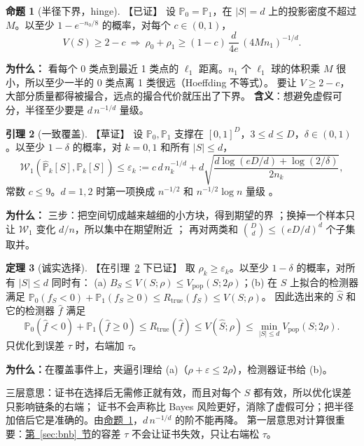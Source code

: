 \documentclass[11pt,a4paper,fontset=none]{ctexart}
\newcommand{\Secref}[1]{\hyperref[#1]{第~\ref*{#1}~节}}
\newcommand{\Nref}[2]{\hyperref[#2]{#1~\ref*{#2}}}
\newcommand{\Vp}{V_{\mathrm{pop}}}
\newcommand{\Rt}{R_{\mathrm{true}}}
\theoremstyle{definition}
\newtheorem{proposition}{命题}
\newtheorem{lemma}[proposition]{引理}
\newtheorem{theorem}[proposition]{定理}
\newenvironment{why}{\par\noindent\textbf{为什么：}\ignorespaces}{\par}
\newcommand{\status}[1]{\textrm{【#1】}}
\begin{document}
\begin{proposition}[半径下界，hinge]\label{prop:collapse}\status{已证}
设 $\mathbb P_0=\mathbb P_1$，在 $|S|=d$ 上的投影密度不超过 $M$。以至少 $1-e^{-n_0/8}$ 的概率，对每个 $c\in(0,1)$，
\[
V(S)\ge2-c\ \Longrightarrow\ \rho_0+\rho_1\ge(1-c)\,\frac d{4e}\,(4Mn_1)^{-1/d}.
\]
\end{proposition}
\begin{why}
看每个 0 类点到最近 1 类点的 $\ell_1$ 距离。$n_1$ 个 $\ell_1$ 球的体积乘 $M$ 很小，所以至少一半的 0 类点离 1 类很远（Hoeffding 不等式）。
要让 $V\ge2-c$，大部分质量都得被撮合，远点的撮合代价就压出了下界。
\textbf{含义}：想避免虚假可分，半径至少要是 $d\,n^{-1/d}$ 量级。
\end{why}

\begin{lemma}[一致覆盖]\label{lem:coverage}\status{草证}
设 $\mathbb P_0,\mathbb P_1$ 支撑在 $[0,1]^D$，$3\le d\le D$，$\delta\in(0,1)$。以至少 $1-\delta$ 的概率，对 $k=0,1$ 和所有 $|S|\le d$，
\[
\mathcal W_1(\widehat{\mathbb P}_k[S],\mathbb P_k[S])\le\varepsilon_k:=c\,d\,n_k^{-1/d}+d\sqrt{\frac{d\log(eD/d)+\log(2/\delta)}{2n_k}},
\]
常数 $c\le9$。$d=1,2$ 时第一项换成 $n^{-1/2}$ 和 $n^{-1/2}\log n$ 量级 \cite{fournier2015rate}。
\end{lemma}
\begin{why}
三步：把空间切成越来越细的小方块，得到期望的界 \cite{weed2019sharp}；换掉一个样本只让 $\mathcal W_1$ 变化 $d/n$，所以集中在期望附近 \cite{mcdiarmid1989method}；
再对两类和 $\binom Dd\le(eD/d)^d$ 个子集取并。
\end{why}

\begin{theorem}[诚实选择]\label{thm:honest}\status{在引理~\ref{lem:coverage} 下已证}
取 $\rho_k\ge\varepsilon_k$。以至少 $1-\delta$ 的概率，对所有 $|S|\le d$ 同时有：
(a) $B_S\le V(S;\rho)\le\Vp(S;2\rho)$；(b) 在 $S$ 上拟合的检测器满足 $\mathbb P_0(f_S<0)+\mathbb P_1(f_S\ge0)\le\Rt(f_S)\le V(S;\rho)$。
因此选出来的 $\widehat S$ 和它的检测器 $\widehat f$ 满足
\[
\mathbb P_0(\widehat f<0)+\mathbb P_1(\widehat f\ge0)\le\Rt(\widehat f)\le V(\widehat S;\rho)\le\min_{|S|\le d}\Vp(S;2\rho).
\]
只优化到误差 $\tau$ 时，右端加 $\tau$。
\end{theorem}
\begin{why}在覆盖事件上，夹逼引理给 (a)（$\rho+\varepsilon\le2\rho$），检测器证书给 (b)。\end{why}
三层意思：证书在选择后无需修正就有效，而且对每个 $S$ 都有效，所以优化误差只影响链条的右端；
证书不会声称比 Bayes 风险更好，消除了虚假可分；把半径加倍后它是准确的。由\Nref{命题}{prop:collapse}，$d\,n^{-1/d}$ 的阶不能再降。
第一层意思对计算很重要：\Secref{sec:bnb}的容差 $\tau$ 不会让证书失效，只让右端松 $\tau$。
\end{document}
